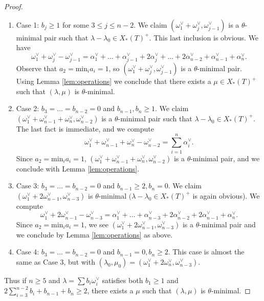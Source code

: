 \documentclass[a4paper, 12pt]{amsart}
\theoremstyle{definition}
\begin{document}
\begin{proof}
\begin{enumerate}
\item Case 1: $b_j \geq 1$ for some $3 \leq j \leq n-2$. We claim $(\omega_1^\vee+\omega_{j}^\vee, \omega_{j-1}^\vee)$ is a $\theta$-minimal pair such that $\lambda-\lambda_0 \in X_*(T)^+$. This last inclusion is obvious. We have \[\omega_1^\vee+\omega_j^\vee-\omega_{j-1}^\vee=\alpha_1^\vee + \dots +\alpha_{j-1}^\vee+2\alpha_j^\vee +\dots +2 \alpha_{n-2}^\vee+\alpha_{n-1}^\vee+\alpha_n^\vee.\] Observe that $a_2= \mathrm{min}_i a_i=1$, so $(\omega_1^\vee+\omega_j^\vee, \omega_{j-1}^\vee)$ is a $\theta$-minimal pair. Using Lemma \ref{lem:operations} we conclude that there exists a $\mu \in X_*(T)^+$ such that $(\lambda, \mu)$ is $\theta$-minimal. 
\item Case 2: $b_3= \dots =b_{n-2}=0$ and $b_{n-1}, b_{n} \geq 1$. We claim $(\omega_1^\vee + \omega_{n-1}^\vee+\omega_n^\vee, \omega_{n-2}^\vee)$ is a $\theta$-minimal pair such that $\lambda- \lambda_0 \in X_*(T)^+$. The last fact is immediate, and we compute 
\[\omega_1^\vee+\omega_{n-1}^\vee+\omega_{n}^\vee-\omega_{n-2}^\vee= \sum_{i=1}^{n} \alpha_i^\vee. \] Since $a_2 = \mathrm{min}_i a_i =1$, $(\omega_1^\vee + \omega_{n-1}^\vee+\omega_n^\vee, \omega_{n-2}^\vee)$ is a $\theta$-minimal pair, and we conclude with Lemma \ref{lem:operations}. 
\item Case 3: $b_3 = \dots =b_{n-2}=0$ and $b_{n-1} \geq 2, b_{n}=0$. We claim $(\omega_1^\vee+2 \omega_{n-1}^\vee, \omega_{n-3}^\vee)$ is $\theta$-minimal $(\lambda-\lambda_0 \in X_*(T)^+$ is again obvious). We compute 
\[\omega_1^\vee+2\omega_{n-1}^\vee- \omega_{n-3}^\vee=\alpha_1^\vee + \dots +\alpha_{n-3}^\vee+2 \alpha_{n-2}^\vee+2\alpha_{n-1}^\vee+\alpha_n^\vee.\] Since $a_2 = \mathrm{min}_i a_i = 1$, we see $(\omega_1^\vee+2 \omega_{n-1}^\vee, \omega_{n-3}^\vee)$ is a $\theta$-minimal pair and we conclude by Lemma \ref{lem:operations} as above. 
\item Case 4: $b_3= \dots =b_{n-2}=0$ and $b_{n-1}=0, b_n \geq 2$. This case is almost the same as Case 3, but with $(\lambda_0, \mu_0)= (\omega_1^\vee+2 \omega_n^\vee, \omega_{n-3}^\vee)$. 
\end{enumerate}
Thus if $n \geq 5 $ and  $\lambda=\sum b_i \omega_i^\vee$ satisfies both $b_1 \geq 1$ and $2 \sum_{i=3}^{n-2}b_i+b_{n-1}+b_n \geq 2$, there exists a $\mu$ such that $(\lambda, \mu)$ is $\theta$-minimal. 


\end{proof}
\end{document}
